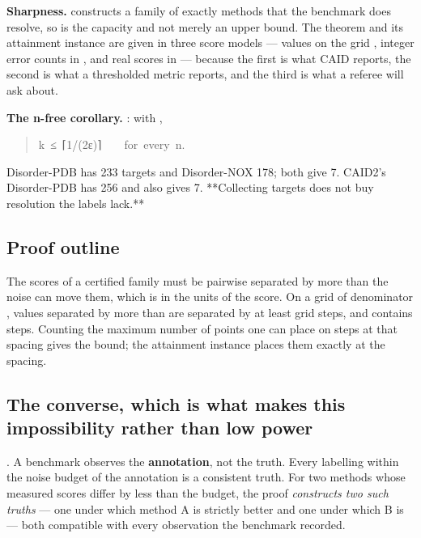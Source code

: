 \textbf{Sharpness.}  constructs a family of exactly 
methods that the benchmark does resolve, so  is the capacity and not merely
an upper bound. The theorem and its attainment instance are given in three score
models --- values on the grid , integer error counts in ,
and real scores in \code{[0, R]} --- because the first is what CAID reports, the second
is what a thresholded metric reports, and the third is what a referee will ask
about.

\textbf{The n-free corollary.} : with ,

\begin{quote}\ttfamily\footnotesize\begin{flushleft}
k~≤~⌈1/(2ε)⌉~~~~for~every~n.\\
\end{flushleft}\end{quote}

Disorder-PDB has 233 targets and Disorder-NOX 178; both give 7. CAID2's
Disorder-PDB has 256 and also gives 7. **Collecting targets does not buy
resolution the labels lack.**


\subsection*{Proof outline}

The scores of a certified family must be pairwise separated by more than the
noise can move them, which is  in the units of the score. On a grid of
denominator , values separated by more than  are separated by at least
 grid steps, and \code{[0, 1]} contains  steps. Counting the maximum
number of points one can place on  steps at that spacing gives the bound; the
attainment instance places them exactly at the spacing.


\subsection*{The converse, which is what makes this impossibility rather than low power}

. A benchmark observes the \textbf{annotation}, not the truth.
Every labelling within the noise budget of the annotation is a consistent
truth. For two methods whose measured scores differ by less than the budget, the
proof \emph{constructs two such truths} --- one under which method A is strictly better
and one under which B is --- both compatible with every observation the benchmark
recorded.

